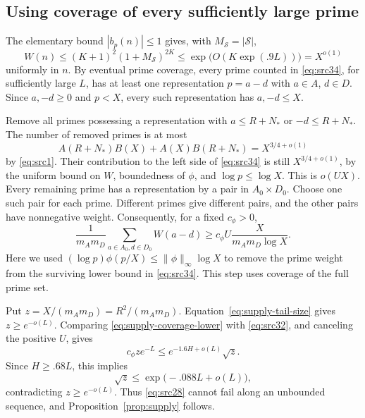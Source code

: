 \subsection{Using coverage of every sufficiently large prime}

The elementary bound \(|b_p(n)|\le1\) gives, with
\(M_{\mathcal S}=|\mathcal S|\),
\[
 W(n)\le
  (K+1)^2(1+M_{\mathcal S})^{2K}
  \le\exp\bigl(O(K\exp(.9L))\bigr)=X^{o(1)}
\]
uniformly in \(n\).
By eventual prime coverage, every prime counted in
\eqref{eq:src34}, for sufficiently large \(L\), has at least one
representation \(p=a-d\) with \(a\in A\), \(d\in D\).
Since \(a,-d\ge0\) and \(p<X\), every such representation has
\(a,-d\le X\).

Remove all primes possessing a representation with
\(a\le R+N_*\) or \(-d\le R+N_*\).
The number of removed primes is at most
\[
 A(R+N_*)B(X)+A(X)B(R+N_*)=X^{3/4+o(1)}
\]
by \eqref{eq:src1}. Their contribution to the left side of
\eqref{eq:src34} is still \(X^{3/4+o(1)}\), by the uniform
bound on \(W\), boundedness of \(\phi\), and \(\log p\le\log X\).
This is \(o(UX)\).
Every remaining prime has a representation by a pair in
\(A_0\times D_0\). Choose one such pair for each prime.
Different primes give different pairs, and the other pairs have
nonnegative weight. Consequently, for a fixed \(c_\phi>0\),
\begin{equation}\label{eq:supply-coverage-lower}
 \frac1{m_Am_D}\sum_{a\in A_0,d\in D_0}W(a-d)
 \ge
 c_\phi U\frac{X}{m_Am_D\log X}.
\end{equation}
Here we used
\((\log p)\phi(p/X)\le\|\phi\|_\infty\log X\)
to remove the prime weight from the surviving lower bound in
\eqref{eq:src34}. This step uses coverage of the full prime set.

Put \(z=X/(m_Am_D)=R^2/(m_Am_D)\).
Equation~\eqref{eq:supply-tail-size} gives \(z\ge e^{-o(L)}\).
Comparing \eqref{eq:supply-coverage-lower} with
\eqref{eq:src32}, and canceling the positive \(U\), gives
\[
 c_\phi z e^{-L}
 \le e^{-1.6H+o(L)}\sqrt z.
\]
Since \(H\ge .68L\), this implies
\[
 \sqrt z\le\exp\bigl(-.088L+o(L)\bigr),
\]
contradicting \(z\ge e^{-o(L)}\).
Thus \eqref{eq:src28} cannot fail along an unbounded sequence,
and Proposition~\ref{prop:supply} follows.

